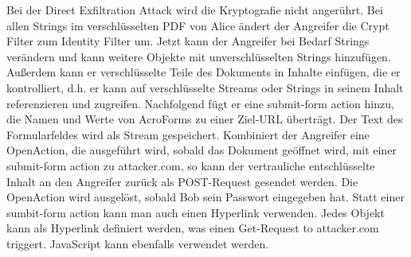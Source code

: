 \par
Bei der Direct Exfiltration Attack wird die Kryptografie nicht angerührt. Bei allen Strings im verschlüsselten PDF von Alice ändert der Angreifer die Crypt Filter zum Identity Filter um. Jetzt kann der Angreifer bei Bedarf Strings verändern und kann weitere Objekte mit unverschlüsselten Strings hinzufügen. Außerdem kann er verschlüsselte Teile des Dokuments in Inhalte einfügen, die er kontrolliert, d.h. er kann auf verschlüsselte Streams oder Strings in seinem Inhalt referenzieren und zugreifen. Nachfolgend fügt er eine submit-form action hinzu, die Namen und Werte von AcroForms zu einer Ziel-URL überträgt. Der Text des Formularfeldes wird als Stream gespeichert. Kombiniert der Angreifer eine OpenAction, die ausgeführt wird, sobald das Dokument geöffnet wird, mit einer submit-form action zu attacker.com, so kann der vertrauliche entschlüsselte Inhalt an den Angreifer zurück als POST-Request gesendet werden. Die OpenAction wird ausgelöst, sobald Bob sein Passwort eingegeben hat. Statt einer sumbit-form action kann man auch einen Hyperlink verwenden. Jedes Objekt kann als Hyperlink definiert werden, was einen Get-Request to attacker.com triggert. JavaScript kann ebenfalls verwendet werden. \cite{ccc-break-pdf, pdfex}
\par
